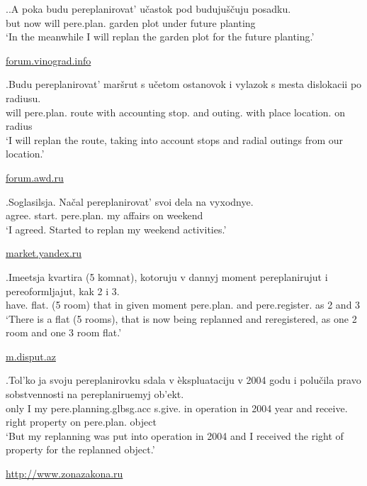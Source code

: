 \ex.\label{ex:pereplanirovat:imperf}\ag.\label{ex:pereplanirovat:future1}A poka budu pereplanirovat'\textsuperscript{\IPF} u\v{c}astok pod buduju\v{s}\v{c}uju posadku.\\
but now will pere.plan. {garden plot} under future planting\\
\trans `In the meanwhile I will replan the garden plot for the future planting.'
\begin{flushright}
\vspace{-0.5em}
\url{forum.vinograd.info}
\end{flushright}
\bg.\label{ex:pereplanirovat:future2}Budu pereplanirovat' mar\v{s}rut s u\v{c}etom ostanovok i vylazok s mesta dislokacii po radiusu.\\
will pere.plan. route with accounting stop. and outing. with place location. on radius\\
\trans `I will replan the route, taking into account stops and radial outings from our location.'
\begin{flushright}
\vspace{-0.5em}
\url{forum.awd.ru}
\end{flushright}
\bg.\label{ex:pereplanirovat:start}Soglasilsja. Na\v{c}al pereplanirovat' svoi dela na vyxodnye.\\
agree. start. pere.plan. my affairs on weekend\\
\trans `I agreed. Started to replan my weekend activities.'
\begin{flushright}
\vspace{-0.5em}
\url{market.yandex.ru}
\end{flushright}
\bg.\label{ex:pereplanirovat:prog}Imeetsja kvartira (5 komnat), kotoruju v dannyj moment pereplanirujut i pereoformljajut, kak 2 i 3.\\
have. flat. (5 room) that in given moment pere.plan. and pere.register. as 2 and 3\\
\trans `There is a flat (5 rooms), that is now being replanned and reregistered, as one 2 room and one 3 room flat.'
\begin{flushright}
\vspace{-0.5em}
\url{m.disput.az}
\end{flushright}
\bg.\label{ex:pereplanirovat:part}Tol'ko ja svoju pereplanirovku sdala v \`{e}kspluataciju v 2004 godu i polu\v{c}ila pravo sobstvennosti na pereplaniruemyj ob'ekt.\\
only I my pere.planning.glb{sg.acc} s.give. in operation in 2004 year and receive. right property on pere.plan. object\\
`But my replanning was put into operation in 2004 and I received the right of property for the replanned object.'
\begin{flushright}
\url{http://www.zonazakona.ru}
\end{flushright}

